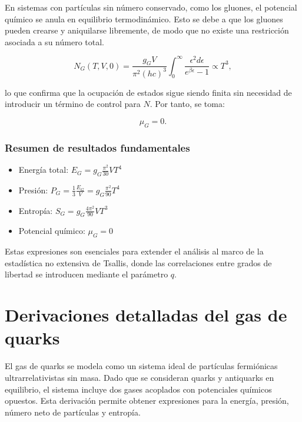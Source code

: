 En sistemas con partículas sin número conservado, como los gluones, el potencial químico se anula en equilibrio termodinámico. Esto se debe a que los gluones pueden crearse y aniquilarse libremente, de modo que no existe una restricción asociada a su número total.

\begin{equation}
N_G(T,V,0) = \frac{g_G V}{\pi^2 (hc)^3} \int_0^\infty \frac{\epsilon^2 d\epsilon}{e^{\beta\epsilon} - 1} \propto T^3,
\end{equation}

lo que confirma que la ocupación de estados sigue siendo finita sin necesidad de introducir un término de control para \( N \). Por tanto, se toma:

\begin{equation}
\mu_G = 0.
\end{equation}


\subsubsection*{Resumen de resultados fundamentales}

\begin{itemize}
    \item Energía total: \( E_G = g_G \frac{\pi^2}{30} V T^4 \)
    \item Presión: \( P_G = \frac{1}{3} \frac{E_G}{V} = g_G \frac{\pi^2}{90} T^4 \)
    \item Entropía: \( S_G = g_G \frac{4\pi^2}{90} V T^3 \)
    \item Potencial químico: \( \mu_G = 0 \)
\end{itemize}

Estas expresiones son esenciales para extender el análisis al marco de la estadística no extensiva de Tsallis, donde las correlaciones entre grados de libertad se introducen mediante el parámetro \( q \).



\section{Derivaciones detalladas del gas de quarks}
\label{app:FD_derivation}

El gas de quarks se modela como un sistema ideal de partículas fermiónicas ultrarrelativistas sin masa. Dado que se consideran quarks y antiquarks en equilibrio, el sistema incluye dos gases acoplados con potenciales químicos opuestos. Esta derivación permite obtener expresiones para la energía, presión, número neto de partículas y entropía.

